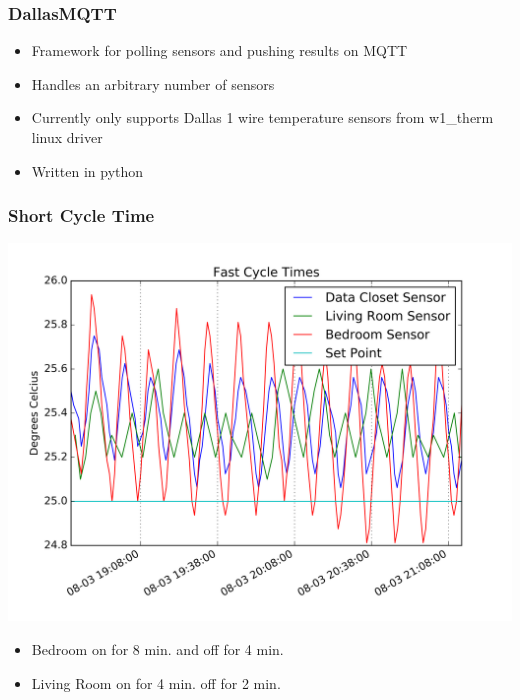 \documentclass[aspectratio=169,11pt,hyperref={colorlinks=true}]{beamer}
\begin{document}
\begin{frame}
    \frametitle{DallasMQTT}
    \begin{itemize}
        \item Framework for polling sensors and pushing results on MQTT
        \item Handles an arbitrary number of sensors
        \item Currently only supports Dallas 1 wire temperature sensors from w1\_therm linux driver
        \item Written in python
    \end{itemize}
\end{frame}

\begin{frame}
    \frametitle{Short Cycle Time}
    \begin{center}
        \includegraphics[height=.75\textheight]{short_cycle.png}
    \end{center}
    \begin{itemize}
        \item Bedroom on for 8 min. and off for 4 min.
        \item Living Room on for 4 min. off for 2 min.
    \end{itemize}
\end{frame}
\end{document}
